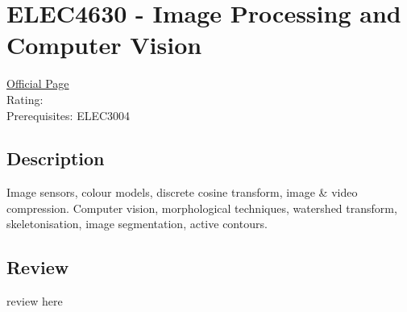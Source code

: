 \hypertarget{ELEC4630}{\section{ELEC4630 - Image Processing and Computer Vision}}

\large
\textcolor{turbo_purple}{\href{https://my.uq.edu.au/programs-courses/course.html?course_code=ELEC4630}{Official Page}} \\
Rating: \cstar\cstar\cstar\cstar\ostar \\
Prerequisites: ELEC3004

\normalsize
\subsection*{Description}
Image sensors, colour models, discrete cosine transform, image \& video compression.
Computer vision, morphological techniques, watershed transform, skeletonisation, image segmentation, active contours.

\subsection*{Review}
review here
